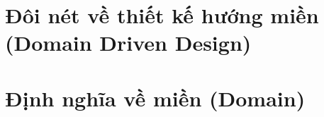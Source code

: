 \section{Đôi nét về thiết kế hướng miền (Domain Driven Design)}




\section{Định nghĩa về miền (Domain)}







